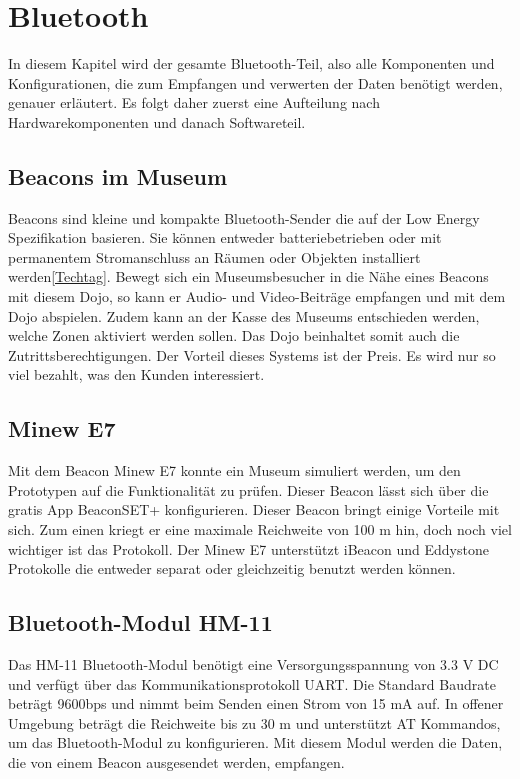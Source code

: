 \chapter{Bluetooth}
\label{Bluetooth}
\thispagestyle{fancy} 
In diesem Kapitel wird der gesamte Bluetooth-Teil, also alle Komponenten und Konfigurationen, die zum Empfangen und verwerten der Daten benötigt werden, genauer erläutert. Es folgt daher zuerst eine Aufteilung nach Hardwarekomponenten und danach Softwareteil. 

\section{Beacons im Museum}
Beacons sind kleine und kompakte Bluetooth-Sender die auf der Low Energy Spezifikation basieren. Sie können entweder batteriebetrieben oder mit permanentem Stromanschluss an Räumen oder Objekten installiert werden\ref{Techtag}. Bewegt sich ein Museumsbesucher in die Nähe eines Beacons mit diesem Dojo, so kann er Audio- und Video-Beiträge empfangen und mit dem Dojo abspielen. Zudem kann an der Kasse des Museums entschieden werden, welche Zonen aktiviert werden sollen. Das Dojo beinhaltet somit auch die Zutrittsberechtigungen. Der Vorteil dieses Systems ist der Preis. Es wird nur so viel bezahlt, was den Kunden  interessiert.	

\section{Minew E7}
Mit dem Beacon Minew E7 konnte ein Museum simuliert werden, um den Prototypen auf die Funktionalität zu prüfen. Dieser Beacon lässt sich über die gratis App BeaconSET+  konfigurieren. Dieser Beacon bringt einige Vorteile mit sich. Zum einen kriegt er eine maximale Reichweite von 100 m  hin, doch noch viel wichtiger ist das Protokoll. Der Minew E7 unterstützt iBeacon und Eddystone Protokolle die entweder separat oder gleichzeitig benutzt werden können. 

\section{Bluetooth-Modul HM-11}
Das HM-11 Bluetooth-Modul benötigt eine Versorgungsspannung von 3.3 V DC und verfügt über das Kommunikationsprotokoll UART. Die Standard Baudrate beträgt 9600bps und nimmt beim Senden einen Strom von 15 mA auf. In offener Umgebung beträgt die Reichweite bis zu 30 m und unterstützt AT Kommandos, um das Bluetooth-Modul zu konfigurieren. Mit diesem Modul werden die Daten, die von einem Beacon ausgesendet werden, empfangen.  

